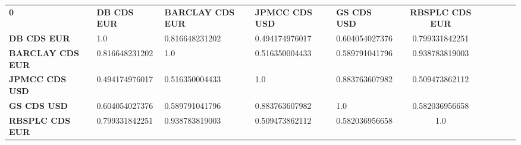 \begin{center}
 \begin{tabular}{|l|l|l|l|l|c|c|c|c|c|}
\hline
\textbf{0} & \textbf{DB CDS EUR} & \textbf{BARCLAY CDS EUR} & \textbf{JPMCC CDS USD} & \textbf{GS CDS USD} & \textbf{RBSPLC CDS EUR}\\\hhline{|=|=|=|=|=|=|}
\textbf{DB CDS EUR} & 1.0 & 0.816648231202 & 0.494174976017 & 0.604054027376 & 0.799331842251\\
\textbf{BARCLAY CDS EUR} & 0.816648231202 & 1.0 & 0.516350004433 & 0.589791041796 & 0.938783819003\\
\textbf{JPMCC CDS USD} & 0.494174976017 & 0.516350004433 & 1.0 & 0.883763607982 & 0.509473862112\\
\textbf{GS CDS USD} & 0.604054027376 & 0.589791041796 & 0.883763607982 & 1.0 & 0.582036956658\\
\textbf{RBSPLC CDS EUR} & 0.799331842251 & 0.938783819003 & 0.509473862112 & 0.582036956658 & 1.0\\
\hline
\end{tabular}
\end{center}